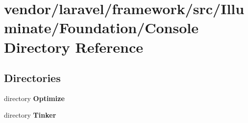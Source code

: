 \section{vendor/laravel/framework/src/\+Illuminate/\+Foundation/\+Console Directory Reference}
\label{dir_925ce1a8c3884cfd7abf505c1c059ebe}
\subsection*{Directories}
\begin{DoxyCompactItemize}
\item 
directory {\bf Optimize}
\item 
directory {\bf Tinker}
\end{DoxyCompactItemize}

